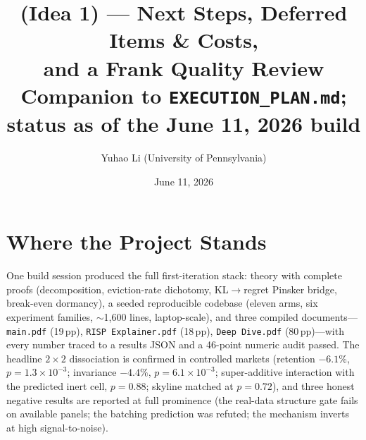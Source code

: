 \documentclass[11pt]{article}
\title{\textbf{\nm{} (Idea 1) --- Next Steps, Deferred Items \& Costs,\\ and a Frank Quality Review}\\[4pt]
\large Companion to \texttt{EXECUTION\_PLAN.md}; status as of the June 11, 2026 build}
\author{Yuhao Li (University of Pennsylvania)}
\date{June 11, 2026}
\begin{document}
\maketitle

\section{Where the Project Stands}
One build session produced the full first-iteration stack: theory with complete proofs
(decomposition, eviction-rate dichotomy, KL$\to$regret Pinsker bridge, break-even
dormancy), a seeded reproducible codebase (eleven arms, six experiment families,
$\sim$1{,}600 lines, laptop-scale), and three compiled documents---\texttt{main.pdf}
(19\,pp), \texttt{RISP Explainer.pdf} (18\,pp), \texttt{Deep Dive.pdf}
(80\,pp)---with every number traced to a results JSON and a 46-point numeric audit
passed. The headline $2{\times}2$ dissociation is confirmed in controlled markets
(retention $-6.1\%$, $p{=}1.3{\times}10^{-3}$; invariance $-4.4\%$,
$p{=}6.1{\times}10^{-3}$; super-additive interaction with the predicted inert cell,
$p{=}0.88$; skyline matched at $p{=}0.72$), and three honest negative results are
reported at full prominence (the real-data structure gate fails on available panels;
the batching prediction was refuted; the mechanism inverts at high signal-to-noise).
\end{document}
